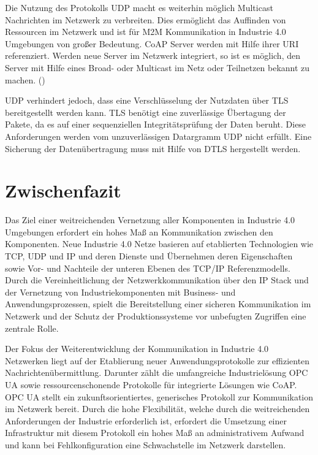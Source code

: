 Die Nutzung des Protokolls \ac{UDP} macht es weiterhin möglich Multicast Nachrichten im Netzwerk zu verbreiten. Dies ermöglicht das Auffinden von Ressourcen im Netzwerk und ist für \ac{M2M} Kommunikation in Industrie 4.0 Umgebungen von großer Bedeutung. \ac{CoAP} Server werden mit Hilfe ihrer \ac{URI} referenziert. Werden neue Server im Netzwerk integriert, so ist es möglich, den Server mit Hilfe eines Broad- oder Multicast im Netz oder Teilnetzen bekannt zu machen. (\cite{trapickin2013})

\ac{UDP} verhindert jedoch, dass eine Verschlüsselung der Nutzdaten über \ac{TLS} bereitgestellt werden kann. \ac{TLS} benötigt eine zuverlässige Übertagung der Pakete, da es auf einer sequenziellen Integritätsprüfung der Daten beruht. Diese Anforderungen werden vom unzuverlässigen Datargramm \ac{UDP} nicht erfüllt. Eine Sicherung der Datenübertragung muss mit Hilfe von \ac{DTLS} hergestellt werden.

\section{Zwischenfazit}
\label{Analyse:Zwischenfazit}
Das Ziel einer weitreichenden Vernetzung aller Komponenten in Industrie 4.0 Umgebungen erfordert ein hohes Maß an Kommunikation zwischen den Komponenten. Neue Industrie 4.0 Netze basieren auf etablierten Technologien wie \ac{TCP}, \ac{UDP} und \ac{IP} und deren Dienste und Übernehmen deren Eigenschaften sowie Vor- und Nachteile der unteren Ebenen des \ac{TCP}/\ac{IP} Referenzmodells. Durch die Vereinheitlichung der Netzwerkkommunikation über den \ac{IP} Stack und der Vernetzung von Industriekomponenten mit Business- und Anwendungsprozessen, spielt die Bereitstellung einer sicheren Kommunikation im Netzwerk und der Schutz der Produktionssysteme vor unbefugten Zugriffen eine zentrale Rolle.

Der Fokus der Weiterentwicklung der Kommunikation in Industrie 4.0 Netzwerken liegt auf der Etablierung neuer Anwendungsprotokolle zur effizienten Nachrichtenübermittlung. Darunter zählt die umfangreiche Industrielösung \ac{OPC UA} sowie ressourcenschonende Protokolle für integrierte Lösungen wie \ac{CoAP}. \ac{OPC UA} stellt ein zukunftsorientiertes, generisches Protokoll zur Kommunikation im Netzwerk bereit. Durch die hohe Flexibilität, welche durch die weitreichenden Anforderungen der Industrie erforderlich ist, erfordert die Umsetzung einer Infrastruktur mit diesem Protokoll ein hohes Maß an administrativem Aufwand und kann bei Fehlkonfiguration eine Schwachstelle im Netzwerk darstellen.

